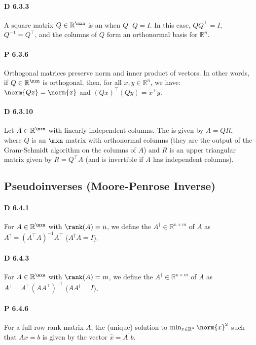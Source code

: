 \paragraph{D 6.3.3} A square matrix $Q\in\mathbb{R}^{\nxn}$ is an
 when $Q^\top Q=I$. In this case, $QQ^\top=I$,
$Q^{-1}=Q^\top$, and the columns of $Q$ form an orthonormal basis for
$\mathbb{R}^n$.

\paragraph{P 6.3.6} Orthogonal matrices preserve norm and inner
product of vectors. In other words, if $Q\in\mathbb{R}^{\nxn}$ is
orthogonal, then, for all $x,y\in\mathbb{R}^n$, we have: $\norm{Qx}=\norm{x}$ and
$(Qx)^\top(Qy)=x^\top y$.

\paragraph{D 6.3.10} Let $A\in\mathbb{R}^{\mxn}$ with linearly
independent columns. The  is given by $A=QR$, where $Q$
is an $\mxn$ matrix with orthonormal columns (they are the output of the
Gram-Schmidt algorithm on the columns of $A$) and $R$ is an upper triangular
matrix given by $R=Q^\top A$ (and is invertible if $A$ has independent columns).

\subsection{Pseudoinverses (Moore-Penrose Inverse)}

\paragraph{D 6.4.1} For $A\in\mathbb{R}^{\mxn}$ with $\rank(A)=n$, we define the
 $A^\dag\in\mathbb{R}^{n\times m}$ of $A$ as
$A^\dag=(A^\top A)^{-1}A^\top$ ($A^\dag A = I$).

\paragraph{D 6.4.3} For $A\in\mathbb{R}^{\mxn}$ with $\rank(A)=m$, we define
the  $A^\dag\in\mathbb{R}^{n\times m}$ of $A$ as
$A^\dag=A^\top(AA^\top)^{-1}$ ($AA^\dag = I$).

\paragraph{P 6.4.6} For a full row rank matrix $A$, the (unique) solution to
$\min_{x\in\mathbb{R}^n}\norm{x}^2$ such that $Ax=b$ is given by the vector
$\hat{x}=A^\dag b$.


